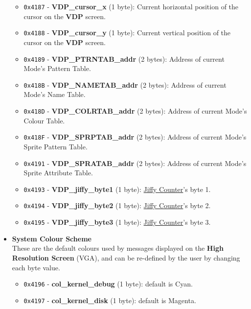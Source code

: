 \begin{itemize}
\begin{itemize}
                \item \texttt{0x4187} - \textbf{VDP\_cursor\_x} (1 byte): Current
                horizontal position of the cursor on the \textbf{VDP} screen.
                \item \texttt{0x4188} - \textbf{VDP\_cursor\_y} (1 byte): Current
                vertical position of the cursor on the \textbf{VDP} screen.
                \item \texttt{0x4189} - \textbf{VDP\_PTRNTAB\_addr} (2 bytes):
                Address of current Mode’s Pattern Table.
                \item \texttt{0x418B} - \textbf{VDP\_NAMETAB\_addr} (2 bytes):
                Address of current Mode’s Name Table.
                \item \texttt{0x418D} - \textbf{VDP\_COLRTAB\_addr} (2 bytes):
                Address of current Mode’s Colour Table.
                \item \texttt{0x418F} - \textbf{VDP\_SPRPTAB\_addr} (2 bytes):
                Address of current Mode’s Sprite Pattern Table.
                \item \texttt{0x4191} - \textbf{VDP\_SPRATAB\_addr} (2 bytes):
                Address of current Mode’s Sprite Attribute Table.
                \item \texttt{0x4193} - \textbf{VDP\_jiffy\_byte1} (1 byte):
                \hyperref[subsec:jiffy_counter]{Jiffy Counter}'s byte 1.
                \item \texttt{0x4194} - \textbf{VDP\_jiffy\_byte2} (1 byte):
                \hyperref[subsec:jiffy_counter]{Jiffy Counter}'s byte 2.
                \item \texttt{0x4195} - \textbf{VDP\_jiffy\_byte3} (1 byte):
                \hyperref[subsec:jiffy_counter]{Jiffy Counter}'s byte 3.
            \end{itemize}
            \item \textbf{System Colour Scheme}
            \\These are the default colours used by messages displayed on the
            \textbf{High Resolution Screen} (VGA), and can be re-defined by the
            user by changing each byte value.
            \begin{itemize}
                \item \texttt{0x4196} - \textbf{col\_kernel\_debug} (1 byte):
                    default is Cyan.
                \item \texttt{0x4197} - \textbf{col\_kernel\_disk} (1 byte):
                    default is Magenta.

\end{itemize}
\end{itemize}
